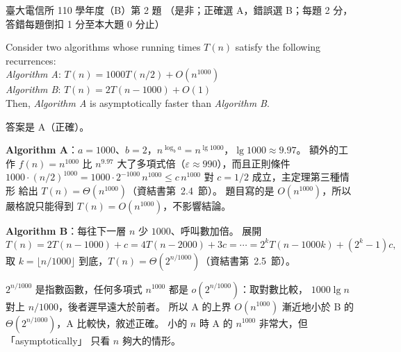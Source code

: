 \begin{pastexam}[label={px:ntu-110-comm-dsa-02}]{臺大電信所 110 學年度（B）第 2 題}
（是非；正確選 A，錯誤選 B；每題 2 分，答錯每題倒扣 1 分至本大題 0 分止）

Consider two algorithms whose running times $T(n)$ satisfy the following recurrences:\\
\textit{Algorithm A}: $T(n)=1000T(n/2)+O(n^{1000})$\\
\textit{Algorithm B}: $T(n)=2T(n-1000)+O(1)$\\
Then, \textit{Algorithm A} is asymptotically faster than \textit{Algorithm B}.
\end{pastexam}

\begin{pastsoln}
答案是 A（正確）。

\textbf{Algorithm A}：$a = 1000$、$b = 2$，$n^{\log_b a} = n^{\lg 1000}$，$\lg 1000 \approx 9.97$。
額外的工作 $f(n) = n^{1000}$ 比 $n^{9.97}$ 大了多項式倍（$\varepsilon \approx 990$），而且正則條件
$1000 \cdot (n/2)^{1000} = 1000 \cdot 2^{-1000} \, n^{1000} \le c\, n^{1000}$ 對 $c = 1/2$ 成立，主定理第三種情形
給出 $T(n) = \Theta(n^{1000})$（資結書第~2.4~節）。 題目寫的是 $O(n^{1000})$，所以嚴格說只能得到
$T(n) = O(n^{1000})$，不影響結論。

\textbf{Algorithm B}：每往下一層 $n$ 少 $1000$、呼叫數加倍。 展開
\[
T(n) = 2T(n - 1000) + c = 4T(n - 2000) + 3c = \cdots = 2^k T(n - 1000k) + (2^k - 1)c,
\]
取 $k = \lfloor n/1000\rfloor$ 到底，$T(n) = \Theta(2^{n/1000})$（資結書第~2.5~節）。

$2^{n/1000}$ 是指數函數，任何多項式 $n^{1000}$ 都是 $o(2^{n/1000})$：取對數比較，
$1000\lg n$ 對上 $n/1000$，後者遲早遠大於前者。 所以 A 的上界 $O(n^{1000})$ 漸近地小於 B 的
$\Theta(2^{n/1000})$，A 比較快，敘述正確。 小的 $n$ 時 A 的 $n^{1000}$ 非常大，但「asymptotically」
只看 $n$ 夠大的情形。
\end{pastsoln}
